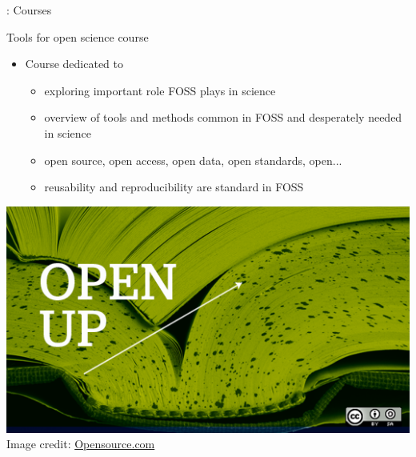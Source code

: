 \documentclass[xcolor={dvipsnames,usenames},beamer,aspectratio=169]{beamer}
\begin{document}
\begin{frame}{\geoforalllab: Courses}

\begin{block}{Tools for open science course}

\begin{itemize}
 \item Course dedicated to
 \begin{itemize}
  \item exploring important role FOSS plays in science
  \item overview of tools and methods common in FOSS and desperately needed in science
  \item open source, open access, open data, open standards, open...
  \item reusability and reproducibility are standard in FOSS
 \end{itemize}
\end{itemize}

\end{block}

\smallskip

\centering
\includegraphics[height=0.4\textheight]{./images/general/open_up_book}%
\\
\tiny
Image credit: \href{https://opensource.com/}{Opensource.com}

\end{frame}
\end{document}
